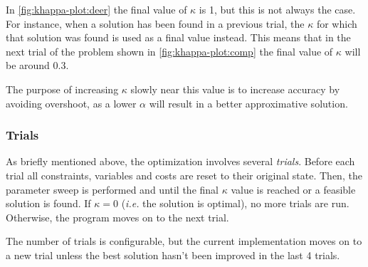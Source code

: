 In \cref{fig:khappa-plot:deer} the final value of \(\kappa\) is 1, but this is not always the case.
For instance, when a solution has been found in a previous trial, the \(\kappa\) for which that solution was found is used as a final value instead.
This means that in the next trial of the problem shown in \cref{fig:khappa-plot:comp} the final value of \(\kappa\) will be around \num{0.3}.

The purpose of increasing \(\kappa\) slowly near this value is to increase accuracy by avoiding overshoot, as a lower \(\alpha\) will result in a better approximative solution.

\subsubsection{Trials}
As briefly mentioned above, the optimization involves several \emph{trials}.
Before each trial all constraints, variables and costs are reset to their original state.
Then, the parameter sweep is performed and until the final \(\kappa\) value is reached or a feasible solution is found.
If \(\kappa=0\) (\emph{i.e.} the solution is optimal), no more trials are run.
Otherwise, the program moves on to the next trial.

The number of trials is configurable, but the current implementation moves on to a new trial unless the best solution hasn't been improved in the last 4 trials.
